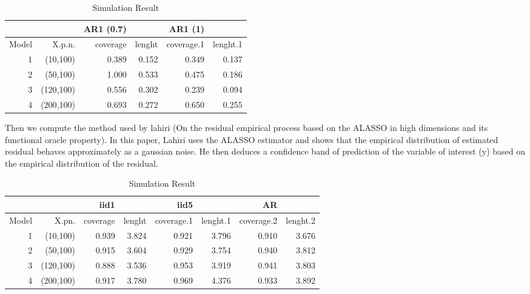 \documentclass[11pt,oneside, a4paper]{amsart}\usepackage[]{graphicx}\usepackage[]{color}
\begin{document}
\begin{table}[ht]
\centering
\caption{Simulation Result} 
\label{Test_table}
{\footnotesize
\begin{tabular}{|r|r|rr|rr|}
  \toprule 
    &  & AR1 (0.7) &  & AR1 (1) &  \\
 \midrule 
Model & X.p.n. & coverage & lenght & coverage.1 & lenght.1 \\ 
    1 & (10,100) & 0.389 & 0.152 & 0.349 & 0.137 \\ 
     2 & (50,100) & 1.000 & 0.533 & 0.475 & 0.186 \\ 
     3 & (120,100) & 0.556 & 0.302 & 0.239 & 0.094 \\ 
     4 & (200,100) & 0.693 & 0.272 & 0.650 & 0.255 \\ 
   \bottomrule 
\end{tabular}
}
\end{table}








Then we compute the method used by lahiri (On the residual empirical process based on the ALASSO in high dimensions and its functional oracle property). In this paper, Lahiri uses the ALASSO estimator and shows that the empirical distribution of estimated residual behaves approximately as a gaussian noise. He then deduces a confidence band of prediction of the variable of interest (y) based on the empirical distribution of the residual.




\begin{table}[ht]
\centering
\caption{Simulation Result} 
\label{Test_table}
{\footnotesize
\begin{tabular}{|r|r|rr|rr|rr|}
  \toprule 
    &  & iid1 &  & iid5 & & AR & \\
 \midrule 
Model & X.pn. & coverage & lenght & coverage.1 & lenght.1 & coverage.2 & lenght.2 \\ 
    1 & (10,100) & 0.939 & 3.824 & 0.921 & 3.796 & 0.910 & 3.676 \\ 
     2 & (50,100) & 0.915 & 3.604 & 0.929 & 3.754 & 0.940 & 3.812 \\ 
     3 & (120,100) & 0.888 & 3.536 & 0.953 & 3.919 & 0.941 & 3.803 \\ 
     4 & (200,100) & 0.917 & 3.780 & 0.969 & 4.376 & 0.933 & 3.892 \\ 
   \bottomrule 
\end{tabular}
}
\end{table}
\end{document}
